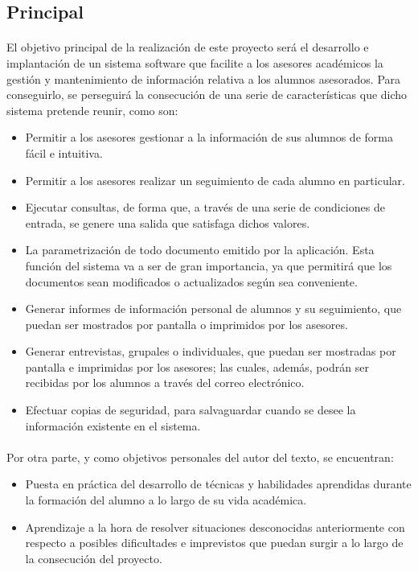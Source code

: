 \subsection{Principal}

\paragraph{}El objetivo principal de la realización de este proyecto será el
desarrollo e implantación de un sistema software que facilite a los asesores
académicos la gestión y mantenimiento de información relativa a los alumnos
asesorados. Para conseguirlo, se perseguirá la consecución de una serie de
características que dicho sistema pretende reunir, como son:

\begin{itemize}
   \item Permitir a los asesores gestionar a la información de sus alumnos de
         forma fácil e intuitiva.
   \item Permitir a los asesores realizar un seguimiento de cada alumno en
         particular.
   \item Ejecutar consultas, de forma que, a través de una serie de condiciones
         de entrada, se genere una salida que satisfaga dichos valores.
   \item La parametrización de todo documento emitido por la aplicación. Esta
         función del sistema va a ser de gran importancia, ya que permitirá que
         los documentos sean modificados o actualizados según sea conveniente.
   \item Generar informes de información personal de alumnos y su seguimiento,
         que puedan ser mostrados por pantalla o imprimidos por los asesores.
   \item Generar entrevistas, grupales o individuales, que puedan ser mostradas
         por pantalla e imprimidas por los asesores; las cuales, además, podrán
         ser recibidas por los alumnos a través del correo electrónico.
   \item Efectuar copias de seguridad, para salvaguardar cuando se desee la
         información existente en el sistema.
\end{itemize}

\paragraph{}Por otra parte, y como objetivos personales del autor del texto, se
encuentran:

\begin{itemize}
   \item Puesta en práctica del desarrollo de técnicas y habilidades aprendidas
   durante la formación del alumno a lo largo de su vida académica.

   \item Aprendizaje a la hora de resolver situaciones desconocidas
   anteriormente con respecto a posibles dificultades e imprevistos que puedan
   surgir a lo largo de la consecución del proyecto.
\end{itemize}